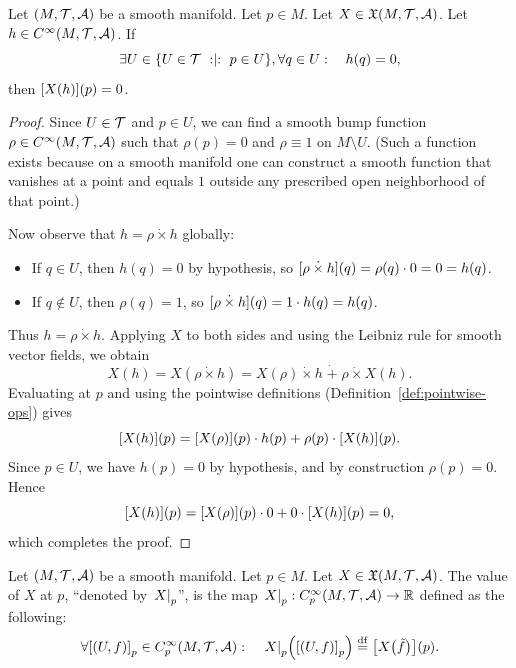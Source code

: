 \documentclass[11pt,reqno]{amsart}
\newcommand{\pwplus}{\mathbin{\dot{+}}}
\newcommand{\pwtimes}{\mathbin{\dot{\times}}}
\begin{document}
\begin{lemma}
\label{lem:locality-vector-field}
Let $(M,\mathcal{T},\mathcal{A})$ be a smooth manifold.
Let $p\in M$.
Let $X\in\mathfrak{X}(M,\mathcal{T},\mathcal{A})$.
Let $h\in C^\infty(M,\mathcal{T},\mathcal{A})$.
If
\[\exists U\in\set{U\in\T\st p\in U},\forall q\in U:\quad h(q)=0,\]
then $\FUNC{X(h)}{p}=0$.
\end{lemma}
\begin{proof}
Since $U\in\mathcal{T}$ and $p\in U$, we can find a smooth bump function
$\rho\in C^\infty(M,\mathcal{T},\mathcal{A})$ such that
$\rho(p)=0$ and $\rho\equiv 1$ on $M\setminus U$.
(Such a function exists because on a smooth manifold one can construct
a smooth function that vanishes at a point and equals $1$ outside any
prescribed open neighborhood of that point.)

Now observe that $h=\rho\pwtimes h$ globally:
\begin{itemize}
\item If $q\in U$, then $h(q)=0$ by hypothesis,
  so $\FUNC{\rho\pwtimes h}{q}=\rho(q)\cdot 0=0=h(q)$.
\item If $q\notin U$, then $\rho(q)=1$, so
  $\FUNC{\rho\pwtimes h}{q}=1\cdot h(q)=h(q)$.
\end{itemize}
Thus $h=\rho\pwtimes h$.  Applying $X$ to both sides and using the
Leibniz rule for smooth vector fields, we obtain
\[
X(h)=X(\rho\pwtimes h)=X(\rho)\pwtimes h\;\pwplus\;\rho\pwtimes X(h).
\]
Evaluating at $p$ and using the pointwise definitions (Definition~\ref{def:pointwise-ops}) gives
\[
\FUNC{X(h)}{p}
=\FUNC{X(\rho)}{p}\cdot h(p)+\rho(p)\cdot\FUNC{X(h)}{p}.
\]
Since $p\in U$, we have $h(p)=0$ by hypothesis, and by construction
$\rho(p)=0$.  Hence
\[
\FUNC{X(h)}{p}= \FUNC{X(\rho)}{p}\cdot 0 + 0\cdot\FUNC{X(h)}{p}=0,
\]
which completes the proof.
\end{proof}

\begin{Def}
Let $(M,\mathcal{T},\mathcal{A})$ be a smooth manifold. Let $p\in M$.
Let $X\in\mathfrak{X}(M,\mathcal{T},\mathcal{A})$.
The value of $X$ at $p$,
``denoted by $\eval{X}_p$'', is the map $\eval{X}_p:C_p^\infty(M,\T,\A)\to\R$
defined as the following:
\[\forall{\SqBr{(U,f)}}_p\in C^\infty_p(M,\T,\A):\quad
\eval{X}_p\Br{{\SqBr{(U,f)}}_p}\df\FUNC{X\Br{\tilde f}}{p}.
\]
\end{Def}
\end{document}
